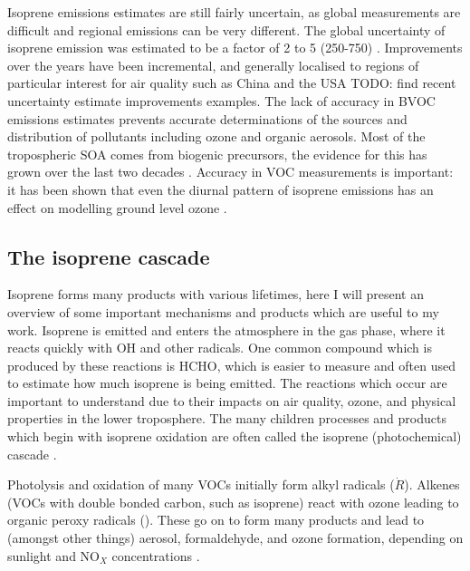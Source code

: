     Isoprene emissions estimates are still fairly uncertain, as global measurements are difficult and regional emissions can be very different. 
    The global uncertainty of isoprene emission was estimated to be a factor of 2 to 5 (250-750\tgpyr) \citep{Kanakidou2005}.
    Improvements over the years have been incremental, and generally localised to regions of particular interest for air quality such as China and the USA TODO: find recent uncertainty estimate improvements examples.
    The lack of accuracy in BVOC emissions estimates prevents accurate determinations of the sources and distribution of pollutants including ozone and organic aerosols.
    Most of the tropospheric SOA comes from biogenic precursors, the evidence for this has grown over the last two decades \citep{Guenther1995, Kanakidou2005,Guenther2012}.
    Accuracy in VOC measurements is important: it has been shown that even the diurnal pattern of isoprene emissions has an effect on modelling ground level ozone \citep{Hewitt2011, Fan2004}.
    
  \subsection{The isoprene cascade}
    \label{LR:VOCs:IsopCascade}
    
    Isoprene forms many products with various lifetimes, here I will present an overview of some important mechanisms and products which are useful to my work.
    Isoprene is emitted and enters the atmosphere in the gas phase, where it reacts quickly with OH and other radicals.
    One common compound which is produced by these reactions is HCHO, which is easier to measure and often used to estimate how much isoprene is being emitted.
    The reactions which occur are important to understand due to their impacts on air quality, ozone, and physical properties in the lower troposphere.
    The many children processes and products which begin with isoprene oxidation are often called the isoprene (photochemical) cascade \cite{Crounse2012,Paulot2012,Wolfe2016}.
    
    Photolysis and oxidation of many VOCs initially form alkyl radicals ($\dot{R}$).
    Alkenes (VOCs with double bonded carbon, such as isoprene) react with ozone leading to organic peroxy radicals (\roo). 
    These go on to form many products and lead to (amongst other things) aerosol, formaldehyde, and ozone formation, depending on sunlight and NO$_X$ concentrations \citep{Atkinson2000}.
    
